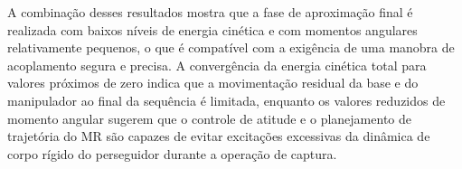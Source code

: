 
A combinação desses resultados mostra que a fase de aproximação final é realizada com baixos níveis de energia cinética e com momentos angulares relativamente pequenos, o que é compatível com a exigência de uma manobra de acoplamento segura e precisa. A convergência da energia cinética total para valores próximos de zero indica que a movimentação residual da base e do manipulador ao final da sequência é limitada, enquanto os valores reduzidos de momento angular sugerem que o controle de atitude e o planejamento de trajetória do MR são capazes de evitar excitações excessivas da dinâmica de corpo rígido do perseguidor durante a operação de captura.
